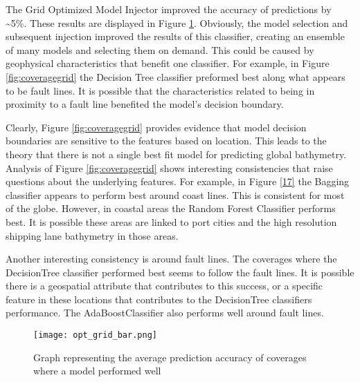 \par
The Grid Optimized Model Injector improved the accuracy of predictions by \~{}5\%.
These results are displayed in Figure \ref{fig:grid_opt_graph}.
Obviously, the model selection and subsequent injection improved the results of this classifier, creating an ensemble of many models and selecting them on demand.
This could be caused by geophysical characteristics that benefit one classifier.
For example, in Figure \ref{fig:coveragegrid} the Decision Tree classifier preformed best along what appears to be fault lines.
It is possible that the characteristics related to being in proximity to a fault line benefited the model's decision boundary. 

\par
Clearly, Figure \ref{fig:coveragegrid} provides evidence that model decision boundaries are sensitive to the features based on location.
This leads to the theory that there is not a single best fit model for predicting global bathymetry.
Analysis of Figure \ref{fig:coveragegrid} shows interesting consistencies that raise questions about the underlying features.
For example, in Figure \ref{17} the Bagging classifier appears to perform best around coast lines. 
This is consistent for most of the globe.
However, in coastal areas the Random Forest Classifier performs best. 
It is possible these areas are linked to port cities and the high resolution shipping lane bathymetry in those areas.

\par
Another interesting consistency is around fault lines.
The coverages where the DecisionTree classifier performed best seems to follow the fault lines.
It is possible there is a geospatial attribute that contributes to this success, or a specific feature in these locations that contributes to the DecisionTree classifiers performance.
The AdaBoostClassifier also performs well around fault lines.

\begin{figure}[htp]
    \centering
    \texttt{[image: opt\_grid\_bar.png]}
    \caption{Graph representing the average prediction accuracy of coverages where a model performed well}
    \label{fig:grid_opt_graph}
\end{figure}

